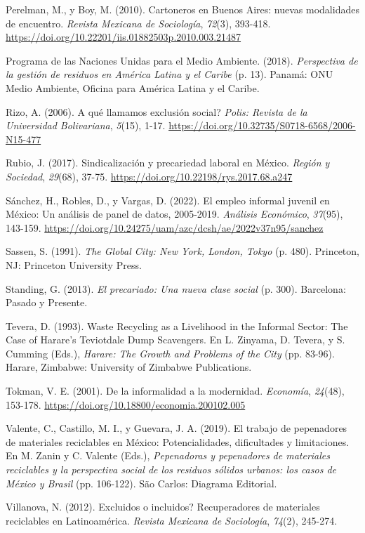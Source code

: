\documentclass[
  spanish,
  11.5pt,
  170mm x 240mmpaper,
]{scrbook}
\newlength{\cslhangindent}
\newenvironment{CSLReferences}[2] %
 {\begin{list}{}{%
  \setlength{\itemindent}{0pt}
  \setlength{\leftmargin}{0pt}
  \setlength{\parsep}{0pt}
  \ifodd #1
   \setlength{\leftmargin}{\cslhangindent}
   \setlength{\itemindent}{-1\cslhangindent}
  \fi
  \setlength{\itemsep}{#2\baselineskip}}}
 {\end{list}}
\begin{document}
\begin{CSLReferences}{1}{0}
Perelman, M., y Boy, M. (2010). {Cartoneros en Buenos Aires: nuevas
modalidades de encuentro}. \emph{Revista Mexicana de Sociología},
\emph{72}(3), 393-418.
\url{https://doi.org/10.22201/iis.01882503p.2010.003.21487}

Programa de las Naciones Unidas para el Medio Ambiente. (2018).
\emph{{Perspectiva de la gestión de residuos en América Latina y el
Caribe}} (p. 13). Panamá: ONU Medio Ambiente, Oficina para América
Latina y el Caribe.

Rizo, A. (2006). {\textquestiondown A qué llamamos exclusión social?}
\emph{Polis: Revista de la Universidad Bolivariana}, \emph{5}(15), 1-17.
\url{https://doi.org/10.32735/S0718-6568/2006-N15-477}

Rubio, J. (2017). {Sindicalización y precariedad laboral en México}.
\emph{Región y Sociedad}, \emph{29}(68), 37-75.
\url{https://doi.org/10.22198/rys.2017.68.a247}

Sánchez, H., Robles, D., y Vargas, D. (2022). {El empleo informal
juvenil en México: Un análisis de panel de datos, 2005-2019}.
\emph{Análisis Económico}, \emph{37}(95), 143-159.
\url{https://doi.org/10.24275/uam/azc/dcsh/ae/2022v37n95/sanchez}

Sassen, S. (1991). \emph{The Global City: {New} York, London, Tokyo} (p.
480). Princeton, NJ: Princeton University Press.

Standing, G. (2013). \emph{{El precariado: Una nueva clase social}} (p.
300). Barcelona: Pasado y Presente.

Tevera, D. (1993). Waste Recycling as a Livelihood in the Informal
Sector: {The} Case of Harare's Teviotdale Dump Scavengers. En L.
Zinyama, D. Tevera, y S. Cumming (Eds.), \emph{Harare: {The} Growth and
Problems of the City} (pp. 83-96). Harare, Zimbabwe: University of
Zimbabwe Publications.

Tokman, V. E. (2001). {De la informalidad a la modernidad}.
\emph{Economía}, \emph{24}(48), 153-178.
\url{https://doi.org/10.18800/economia.200102.005}

Valente, C., Castillo, M. I., y Guevara, J. A. (2019). {El trabajo de
pepenadores de materiales reciclables en México: Potencialidades,
dificultades y limitaciones}. En M. Zanin y C. Valente (Eds.),
\emph{{Pepenadoras y pepenadores de materiales reciclables y la
perspectiva social de los residuos sólidos urbanos: los casos de México
y Brasil}} (pp. 106-122). São Carlos: Diagrama Editorial.

Villanova, N. (2012). {\textquestiondown Excluidos o incluidos?
Recuperadores de materiales reciclables en Latinoamérica}. \emph{Revista
Mexicana de Sociología}, \emph{74}(2), 245-274.

\end{CSLReferences}


\backmatter
\end{document}

